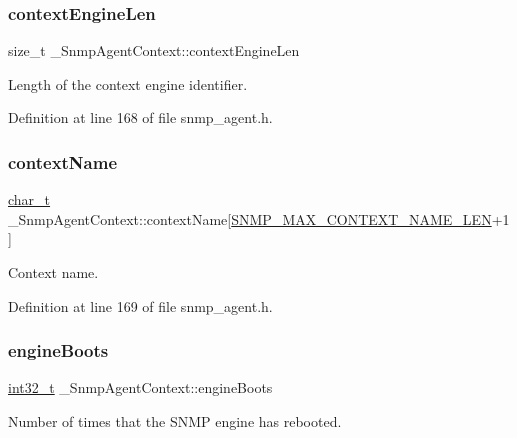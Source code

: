 \subsubsection{\texorpdfstring{context\+Engine\+Len}{contextEngineLen}}
{\footnotesize\ttfamily size\+\_\+t \+\_\+\+Snmp\+Agent\+Context\+::context\+Engine\+Len}



Length of the context engine identifier. 



Definition at line 168 of file snmp\+\_\+agent.\+h.

\mbox{\label{struct__SnmpAgentContext_aaf917523cc2fe327770f073781f0d068}} 
\subsubsection{\texorpdfstring{context\+Name}{contextName}}
{\footnotesize\ttfamily \hyperlink{compiler__port_8h_a40bb5262bf908c328fbcfbe5d29d0201}{char\+\_\+t} \+\_\+\+Snmp\+Agent\+Context\+::context\+Name\mbox{[}\hyperlink{snmp__common_8h_a59ce7ec8feba50f15272257094e14ac8}{S\+N\+M\+P\+\_\+\+M\+A\+X\+\_\+\+C\+O\+N\+T\+E\+X\+T\+\_\+\+N\+A\+M\+E\+\_\+\+L\+EN}+1\mbox{]}}



Context name. 



Definition at line 169 of file snmp\+\_\+agent.\+h.

\mbox{\label{struct__SnmpAgentContext_a4ffa75ed449e0230b556516bac93f4e1}} 
\subsubsection{\texorpdfstring{engine\+Boots}{engineBoots}}
{\footnotesize\ttfamily \hyperlink{stdint_8h_ab1967d8591af1a4e48c37fd2b0f184d0}{int32\+\_\+t} \+\_\+\+Snmp\+Agent\+Context\+::engine\+Boots}



Number of times that the S\+N\+MP engine has rebooted. 



